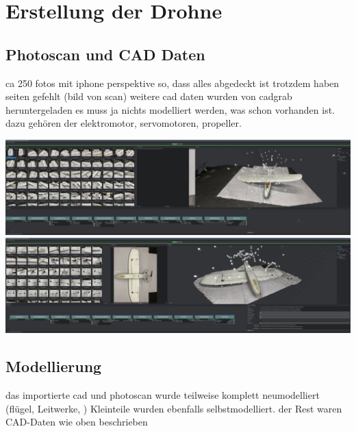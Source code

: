 \section{Erstellung der Drohne}

\subsection{Photoscan und CAD Daten}

ca 250 fotos mit iphone
perspektive so, dass alles abgedeckt ist
trotzdem haben seiten gefehlt
(bild von scan)
weitere cad daten wurden von cadgrab heruntergeladen
es muss ja nichts modelliert werden, was schon vorhanden ist.
dazu gehören der elektromotor, servomotoren, propeller.

\includegraphics[width=\textwidth]{gfx/prod/plane/meshroom1.jpg}
\includegraphics[width=\textwidth]{gfx/prod/plane/meshroom2.jpg}


\subsection{Modellierung}

das importierte cad und photoscan wurde teilweise komplett neumodelliert (flügel, Leitwerke, )
Kleinteile wurden ebenfalls selbstmodelliert.
der Rest waren CAD-Daten wie oben beschrieben

